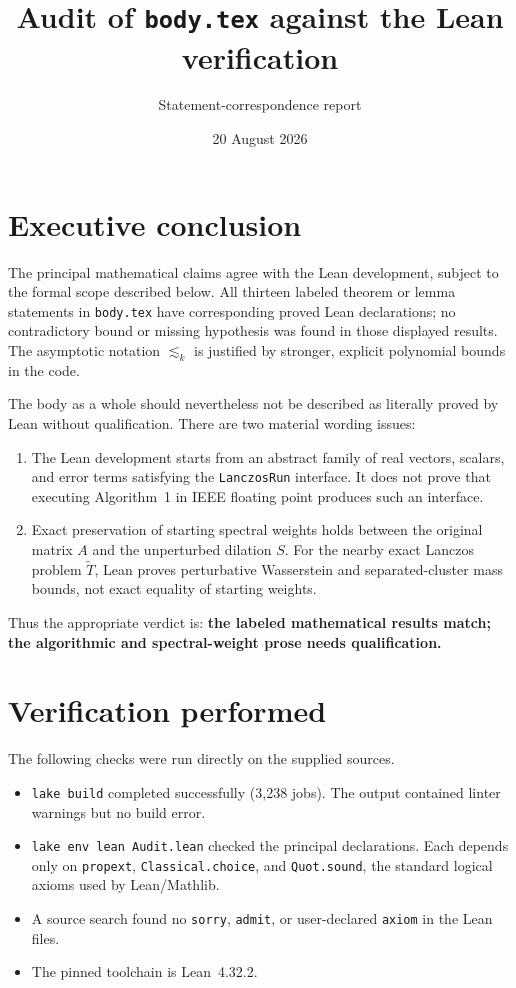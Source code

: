 \documentclass[11pt]{article}
\title{Audit of \texttt{body.tex} against the Lean verification}
\author{Statement-correspondence report}
\date{20 August 2026}
\newcommand{\lean}[1]{\nolinkurl{#1}}
\begin{document}
\maketitle

\section*{Executive conclusion}

The principal mathematical claims agree with the Lean development, subject to
the formal scope described below.  All thirteen labeled theorem or lemma
statements in \texttt{body.tex} have corresponding proved Lean declarations;
no contradictory bound or missing hypothesis was found in those displayed
results.  The asymptotic notation $\lesssim_k$ is justified by stronger,
explicit polynomial bounds in the code.

The body as a whole should nevertheless not be described as literally proved
by Lean without qualification.  There are two material wording issues:

\begin{enumerate}
  \item The Lean development starts from an abstract family of real vectors,
  scalars, and error terms satisfying the \lean{LanczosRun} interface.  It does
  not prove that executing Algorithm~1 in IEEE floating point produces such an
  interface.
  \item Exact preservation of starting spectral weights holds between the
  original matrix $A$ and the unperturbed dilation $S$.  For the nearby exact
  Lanczos problem $\widetilde T$, Lean proves perturbative Wasserstein and
  separated-cluster mass bounds, not exact equality of starting weights.
\end{enumerate}

Thus the appropriate verdict is: \textbf{the labeled mathematical results
match; the algorithmic and spectral-weight prose needs qualification.}

\section*{Verification performed}

The following checks were run directly on the supplied sources.

\begin{itemize}
  \item \texttt{lake\ build} completed successfully (3,238 jobs).  The output
  contained linter warnings but no build error.
  \item \texttt{lake\ env\ lean\ Audit.lean} checked the principal declarations.
  Each depends only on \lean{propext}, \lean{Classical.choice}, and
  \lean{Quot.sound}, the standard logical axioms used by Lean/Mathlib.
  \item A source search found no \lean{sorry}, \lean{admit}, or user-declared
  \lean{axiom} in the Lean files.
  \item The pinned toolchain is Lean~4.32.2.
\end{itemize}
\end{document}
